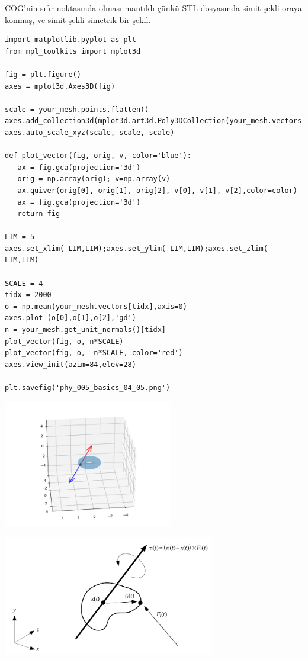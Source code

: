 \documentclass[12pt,fleqn]{article}\usepackage{../../common}
\begin{document}
COG'nin sıfır noktasında olması mantıklı çünkü STL dosyasında simit şekli oraya
konmuş, ve simit şekli simetrik bir şekil.

\begin{verbatim}
import matplotlib.pyplot as plt
from mpl_toolkits import mplot3d

fig = plt.figure()
axes = mplot3d.Axes3D(fig)

scale = your_mesh.points.flatten()
axes.add_collection3d(mplot3d.art3d.Poly3DCollection(your_mesh.vectors,alpha=0.3))
axes.auto_scale_xyz(scale, scale, scale)

def plot_vector(fig, orig, v, color='blue'):
   ax = fig.gca(projection='3d')
   orig = np.array(orig); v=np.array(v)
   ax.quiver(orig[0], orig[1], orig[2], v[0], v[1], v[2],color=color)
   ax = fig.gca(projection='3d')  
   return fig

LIM = 5
axes.set_xlim(-LIM,LIM);axes.set_ylim(-LIM,LIM);axes.set_zlim(-LIM,LIM)

SCALE = 4
tidx = 2000
o = np.mean(your_mesh.vectors[tidx],axis=0)
axes.plot (o[0],o[1],o[2],'gd')
n = your_mesh.get_unit_normals()[tidx]
plot_vector(fig, o, n*SCALE)
plot_vector(fig, o, -n*SCALE, color='red')
axes.view_init(azim=84,elev=28)

plt.savefig('phy_005_basics_04_05.png')
\end{verbatim}

\includegraphics[width=20em]{phy_005_basics_04_05.png}

\includegraphics[width=25em]{phy_008_sim_rigbod_01.png}
\end{document}
